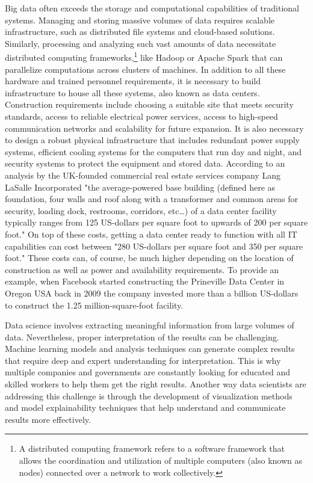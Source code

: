 \documentclass{vgtc}                          %
\begin{document}
Big data often exceeds the storage and computational capabilities of traditional systems. Managing and storing massive volumes of data requires scalable infrastructure, 
such as distributed file systems and cloud-based solutions. Similarly, processing and analyzing such vast amounts of data necessitate distributed computing 
frameworks,\footnote{A distributed computing framework refers to a software framework that allows the coordination and utilization of multiple computers (also known 
as nodes) connected over a network to work collectively.} like Hadoop or Apache Spark that can parallelize computations across clusters of machines. In addition to all these 
hardware and trained personnel requirements, it is necessary to build infrastructure to house all these systems, also known as data centers. Construction requirements include 
choosing a suitable site that meets security standards, access to reliable electrical power services, access to high-speed communication networks and scalability for future expansion. 
It is also necessary to design a robust physical infrastructure that includes redundant power supply systems, efficient cooling systems for the computers that run day and night, and 
security systems to protect the equipment and stored data. According to an analysis by the UK-founded commercial real estate services company Lang LaSalle Incorporated "the 
average-powered base building (defined here as foundation, four walls and roof along with a transformer and common areas for security, loading dock, restrooms, corridors, etc…) of a 
data center facility typically ranges from 125 US-dollars per square foot to upwards of 200 per square foot."\cite{Hawkins:2022} On top of these costs, getting a data center ready to function 
with all IT capabilities can cost between "280 US-dollars per square foot and 350 per square foot."\cite{Hawkins:2022} These costs can, of course, be much higher depending on the location 
of construction as well as power and availability requirements. To provide an example, when Facebook started constructing the Prineville Data Center in Oregon USA back in 2009 the 
company invested more than a billion US-dollars to construct the 1.25 million-square-foot facility.

Data science involves extracting meaningful information from large volumes of data. Nevertheless, proper interpretation of the results can be challenging. Machine learning 
models and analysis techniques can generate complex results that require deep and expert understanding for interpretation. This is why multiple companies and governments are 
constantly looking for educated and skilled workers to help them get the right results. Another way data scientists are addressing this challenge is through the development of 
visualization methods and model explainability techniques that help understand and communicate results more effectively.
\end{document}
